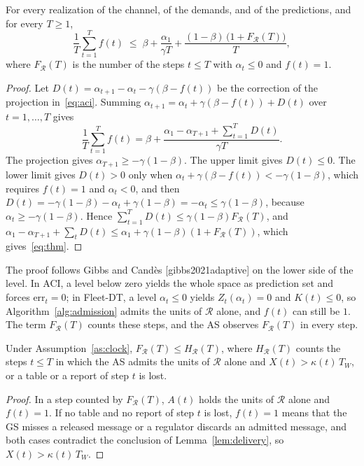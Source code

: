 \begin{theorem}\label{thm:aci}
For every realization of the channel, of the demands, and of the predictions, and for every $T \geq 1$,
\begin{equation}
\frac{1}{T}\sum_{t=1}^{T} f(t) \;\leq\; \beta + \frac{\alpha_1}{\gamma T} + \frac{(1 - \beta)\,\big(1 + F_{\mathcal{R}}(T)\big)}{T},
\label{eq:thm}
\end{equation}
where $F_{\mathcal{R}}(T)$ is the number of the steps $t \leq T$ with $\alpha_t \leq 0$ and $f(t) = 1$.
\end{theorem}
\begin{proof}
Let $D(t) = \alpha_{t+1} - \alpha_t - \gamma(\beta - f(t))$ be the correction of the projection in~\eqref{eq:aci}. Summing $\alpha_{t+1} = \alpha_t + \gamma(\beta - f(t)) + D(t)$ over $t = 1, \dots, T$ gives
\[
\frac{1}{T}\sum_{t=1}^{T} f(t) = \beta + \frac{\alpha_1 - \alpha_{T+1} + \sum_{t=1}^{T} D(t)}{\gamma T}.
\]
The projection gives $\alpha_{T+1} \geq -\gamma(1 - \beta)$. The upper limit gives $D(t) \leq 0$. The lower limit gives $D(t) > 0$ only when $\alpha_t + \gamma(\beta - f(t)) < -\gamma(1-\beta)$, which requires $f(t) = 1$ and $\alpha_t < 0$, and then $D(t) = -\gamma(1-\beta) - \alpha_t + \gamma(1-\beta) = -\alpha_t \leq \gamma(1 - \beta)$, because $\alpha_t \geq -\gamma(1-\beta)$. Hence $\sum_{t=1}^{T} D(t) \leq \gamma(1-\beta) F_{\mathcal{R}}(T)$, and $\alpha_1 - \alpha_{T+1} + \sum_t D(t) \leq \alpha_1 + \gamma(1-\beta)(1 + F_{\mathcal{R}}(T))$, which gives~\eqref{eq:thm}.
\end{proof}

The proof follows Gibbs and Cand\`es [gibbs2021adaptive] on the lower side of the level. In ACI, a level below zero yields the whole space as prediction set and forces $\mathrm{err}_t = 0$; in Fleet-DT, a level $\alpha_t \leq 0$ yields $Z_t(\alpha_t) = 0$ and $K(t) \leq 0$, so Algorithm~\ref{alg:admission} admits the units of $\mathcal{R}$ alone, and $f(t)$ can still be $1$. The term $F_{\mathcal{R}}(T)$ counts these steps, and the AS observes $F_{\mathcal{R}}(T)$ in every step.

\begin{corollary}\label{cor:minimal}
Under Assumption~\ref{as:clock}, $F_{\mathcal{R}}(T) \leq H_{\mathcal{R}}(T)$, where $H_{\mathcal{R}}(T)$ counts the steps $t \leq T$ in which the AS admits the units of $\mathcal{R}$ alone and $X(t) > \kappa(t)\,T_W$, or a table or a report of step $t$ is lost.
\end{corollary}
\begin{proof}
In a step counted by $F_{\mathcal{R}}(T)$, $A(t)$ holds the units of $\mathcal{R}$ alone and $f(t) = 1$. If no table and no report of step $t$ is lost, $f(t) = 1$ means that the GS misses a released message or a regulator discards an admitted message, and both cases contradict the conclusion of Lemma~\ref{lem:delivery}, so $X(t) > \kappa(t)\,T_W$.
\end{proof}

